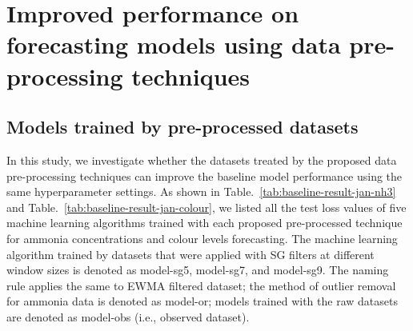 \section{Improved performance on forecasting models using data pre-processing techniques}
\subsection{Models trained by pre-processed datasets}

In this study, we investigate whether the datasets treated by the proposed data pre-processing techniques can improve the baseline model performance using the same hyperparameter settings. As shown in Table.~\ref{tab:baseline-result-jan-nh3} and Table.~\ref{tab:baseline-result-jan-colour}, we listed all the test loss values of five machine learning algorithms trained with each proposed pre-processed technique for ammonia concentrations and colour levels forecasting. The machine learning algorithm trained by datasets that were applied with SG filters at different window sizes is denoted as model-sg5, model-sg7, and model-sg9. The naming rule applies the same to EWMA filtered dataset; the method of outlier removal for ammonia data is denoted as model-or; models trained with the raw datasets are denoted as model-obs (i.e., observed dataset).

